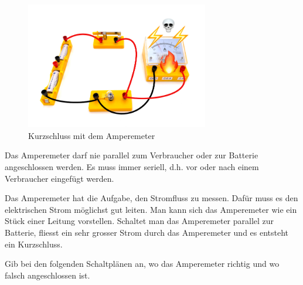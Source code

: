 \begin{figure}[h!]
    \centering
    \includegraphics[width=8cm]{_images/ampere_kurzschluss}
    \caption{Kurzschluss mit dem Amperemeter}
    \label{fig:amperemeter_short_circuit}
\end{figure}

\begin{redbox}
Das Amperemeter darf nie parallel zum Verbraucher oder zur Batterie angeschlossen werden.
Es muss immer seriell, d.h. vor oder nach einem Verbraucher eingefügt werden.
\end{redbox}

Das Amperemeter hat die Aufgabe, den Stromfluss zu messen. Dafür muss es den elektrischen Strom
möglichst gut leiten. Man kann sich das Amperemeter wie ein Stück einer Leitung vorstellen.
Schaltet man das Amperemeter parallel zur Batterie, fliesst ein sehr grosser Strom
durch das Amperemeter und es entsteht ein Kurzschluss.



Gib bei den folgenden Schaltplänen an, wo das Amperemeter richtig und wo falsch angeschlossen ist.

